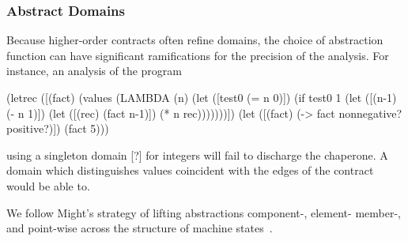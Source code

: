 \documentclass{sigplanconf}
\begin{document}
\subsubsection{Abstract Domains}

Because higher-order contracts often refine domains, the choice of abstraction function can have significant ramifications for the precision of the analysis.
For instance, an analysis of the program
\begin{schemedisplay}
(letrec ([(fact) (values (LAMBDA (n)
                          (let ([test0 (= n 0)])
                            (if test0
                                1
                                (let ([(n-1) (- n 1)])
                                  (let ([(rec) (fact n-1)])
                                    (* n rec)))))))])
  (let ([(fact) (-> fact nonnegative? positive?)])
    (fact 5)))
\end{schemedisplay}
using a singleton domain [?] for integers will fail to discharge the chaperone.
A domain which distinguishes values coincident with the edges of the contract would be able to.

We follow Might's strategy of lifting abstractions component-, element- member-, and point-wise across the structure of machine states~\cite{van2010abstracting}.

\newcommand{\astxclass}[4]{$#1\in\widehat{\mathbf{#2}}$ &::=& #3 & #4}
\newcommand{\aks}[0]{\hat{\gamma}^*}


\end{document}
